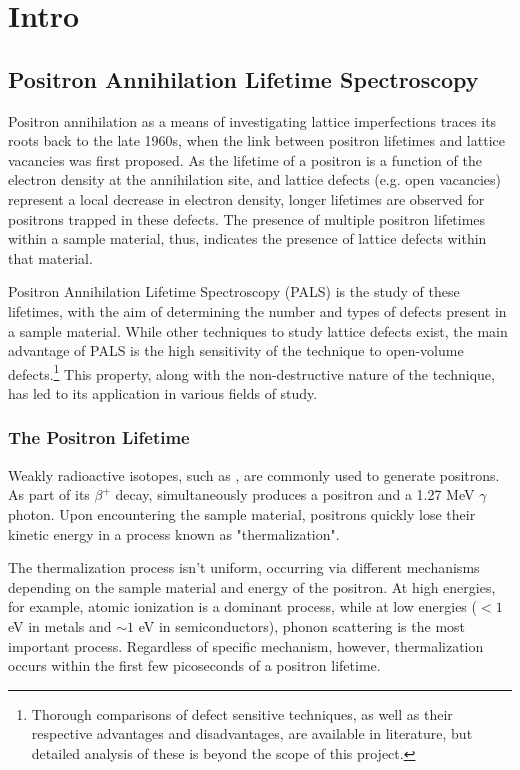 \chapter{Intro}

\section{Positron Annihilation Lifetime Spectroscopy}

Positron annihilation as a means of investigating lattice imperfections traces its roots back to the late 1960s, when the link between positron lifetimes and lattice vacancies was first proposed. \cite{Mackenzie67} As the lifetime of a positron is a function of the electron density at the annihilation site, and lattice defects (e.g. open vacancies) represent a local decrease in electron density, longer lifetimes are observed for positrons trapped in these defects. \cite{Krause} The presence of multiple positron lifetimes within a sample material, thus, indicates the presence of lattice defects within that material.

Positron Annihilation Lifetime Spectroscopy (PALS) is the study of these lifetimes, with the aim of determining the number and types of defects present in a sample material. While other techniques to study lattice defects exist, the main advantage of PALS is the high sensitivity of the technique to open-volume defects.\footnote{Thorough comparisons of defect sensitive techniques, as well as their respective advantages and disadvantages, are available in literature, but detailed analysis of these is beyond the scope of this project.} This property, along with the non-destructive nature of the technique, has led to its application in various fields of study.\cite{PharmApp} \cite{Nuc} 

\subsection{The Positron Lifetime}

Weakly radioactive isotopes, such as , are commonly used to generate positrons. As part of its {$\beta^{+}$} decay,  simultaneously produces a positron and a 1.27 MeV $\gamma$ photon. Upon encountering the sample material, positrons quickly lose their kinetic energy in a process known as "thermalization".

The thermalization process isn't uniform, occurring via different mechanisms depending on the sample material and energy of the positron. At high energies, for example, atomic ionization is a dominant process, while at low energies ($<1$ eV in metals and $\sim1$ eV in semiconductors), phonon scattering is the most important process. Regardless of specific mechanism, however, thermalization occurs within the first few picoseconds of a positron lifetime.

